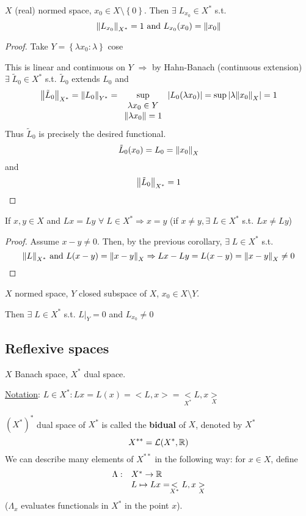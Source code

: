 \begin{corollary}
    \(X\) (real) normed space, \(x_0 \in X \setminus \left\{ 0 \right\}\).
    Then \(\exists \; L_{x_0} \in X^*\) s.t. 
    \[
        \norm{L_{x_0}}_{X^*} = 1 \mbox{ and } L_{x_0}(x_0) = \norm{x_0}
    \]
\end{corollary}
\begin{proof}
    Take \(Y = \left\{ \lambda x_0 : \lambda \right\}\) cose 
    

    This is linear and continuous on \(Y\) \(\Rightarrow\) by Hahn-Banach (continuous extension) \(\exists \; \tilde{L}_0 \in X^*\) s.t. \(\tilde{L}_0\) extends \(L_0\) and 
    \[
        \norm{\tilde{L}_0}_{X^*} = \norm{L_0}_{Y^*} = \sup_{\begin{array}{c}\lambda x_0 \in Y \\ \norm{\lambda x_0} = 1\end{array}}\abs{L_0(\lambda x_0)}= \sup \abs{\lambda \norm{x_0}_X} = 1
    \]
    Thus \(\tilde{L}_0\) is precisely the desired functional.
    \[
        \tilde{L}_0 (x_0) = L_0 = \norm{x_0}_X
    \]
    and 
    \[
        \norm{\tilde{L}_0}_{X^*} = 1
    \]
\end{proof}
\begin{corollary}
    If \(x,y \in X\) and \(Lx = Ly\) \(\forall \; L \in X^* \Rightarrow x = y\) (if \(x \neq y, \exists \; L \in X^*\) s.t. \(Lx \neq Ly\))
\end{corollary}
\begin{proof}
    Assume \(x-y \neq 0\). Then, by the previous corollary, \(\exists \; L \in X^*\) s.t. 
    \[
        \norm{L}_{X^*} \mbox{ and } L(x-y) = \norm{x-y}_X \Rightarrow Lx -Ly = L(x-y) = \norm{x-y}_X \neq 0
    \]
\end{proof}
\begin{corollary}
    \(X\) normed space, \(Y\) closed subspace of \(X\), \(x_0 \in X \setminus Y\). 

    Then \(\exists \; L \in X^*\) s.t. \(L\vert_Y = 0\) and \(L_{x_0} \neq 0\)
\end{corollary}
\subsection*{Reflexive spaces}
\(X\) Banach space, \(X^*\) dual space.

\noindent \underline{Notation}: \(L \in X^*: Lx = L(x) = <L,x> = \underset{X^*}{<}L,x\underset{X}{>}\)

\((X^*)^*\) dual space of \(X^*\) is called the \textbf{bidual} of \(X\), denoted by \(X^*\)
\[
    X^{**} = \mathcal{L}(X^*, \mathbb{R})
\]
We can describe many elements of \(X^{**}\) in the following way: for \(x \in X\), define 
\[
    \begin{array}{ll}
        \Lambda: & X^* \to \mathbb{R} \\
        & L \mapsto Lx = \underset{X^*}{<}L,x\underset{X}{>}
    \end{array}
\]
(\(\Lambda_x\) evaluates functionals in \(X^*\) in the point \(x\)).

